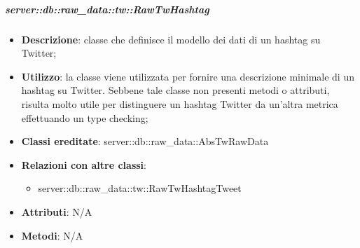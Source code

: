 		\subparagraph{server::db::raw\_data::tw::RawTwHashtag} %
		\label{subp:server_db_raw_data_tw_rawtwhashtag}
			\begin{itemize}
				\item \textbf{Descrizione}: classe che definisce il modello dei dati di un hashtag su Twitter;
				\item \textbf{Utilizzo}: la classe viene utilizzata per fornire una descrizione minimale di un hashtag su Twitter. Sebbene tale classe non presenti metodi o attributi, risulta molto utile per distinguere un hashtag Twitter da un'altra metrica effettuando un type checking;
				\item \textbf{Classi ereditate}: server::db::raw\_data::AbsTwRawData
				\item \textbf{Relazioni con altre classi}:
					\begin{itemize}
						\item server::db::raw\_data::tw::RawTwHashtagTweet
					\end{itemize}
				\item \textbf{Attributi}: N/A
				\item \textbf{Metodi}: N/A
			\end{itemize}


